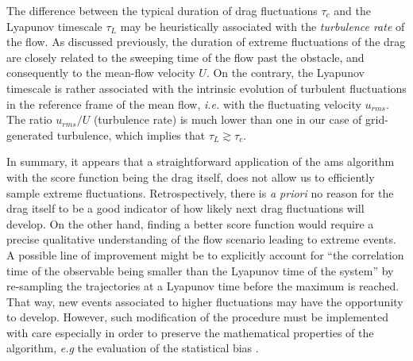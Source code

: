 \documentclass[pre,aps,floatfix,10pt,superscriptaddress, notitlepage,preprint]{revtex4-1}
\begin{document}
The difference between the typical duration of drag fluctuations $\tau_c$ and the Lyapunov timescale $\tau_L$ may be heuristically associated with the \emph{turbulence rate} of the flow.
%
As discussed previously, the duration of extreme fluctuations of the drag are closely related to the sweeping time of the flow past the obstacle, and consequently to the mean-flow velocity $U$. On the contrary, the Lyapunov timescale is rather associated with the intrinsic evolution of turbulent fluctuations in the reference frame of the mean flow, \textit{i.e.} with the fluctuating velocity $u_{rms}$. The ratio $u_{rms}/U$ (turbulence rate) is much lower than one in our case of grid-generated turbulence, which implies that $\tau_L \gtrsim \tau_c$.
 


%
In summary, it appears that a straightforward application of the \ac{ams} algorithm with the score function being the drag itself, does not allow us to efficiently sample extreme fluctuations.
%
Retrospectively, there is \textit{a priori} no reason for the drag itself to be a good indicator of how likely next drag fluctuations will develop.
On the other hand, finding a better score function would require a precise qualitative understanding of the flow scenario leading to extreme events.
%
%
A possible line of improvement might be to explicitly account for ``the correlation time of the observable being smaller than the Lyapunov time of the system'' by re-sampling the trajectories at a Lyapunov time {before} the maximum is reached. That way, new events associated to higher fluctuations may have the opportunity to develop.
However, such modification of the procedure must be implemented with care especially in order to preserve the mathematical properties of the algorithm, \emph{e.g} the evaluation of the statistical bias .
% 
\end{document}
